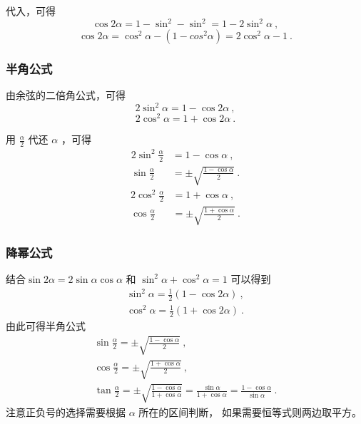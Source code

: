 代入，可得
\begin{equation}
\cos2\alpha = 1 - \sin^2 - \sin^2 = 1 - 2\sin^2\alpha~,
\end{equation}
\begin{equation}
\cos2\alpha = \cos^2\alpha - (1 - cos^2\alpha) = 2\cos^2\alpha - 1~.
\end{equation}

\subsubsection{半角公式}
由余弦的二倍角公式，可得
\begin{equation}
2\sin^2\alpha = 1 - \cos2\alpha~,
\end{equation}
\begin{equation}
2\cos^2\alpha = 1 + \cos2\alpha~.
\end{equation}

用 $\frac{\alpha}{2}$ 代还 $\alpha$ ，可得
\begin{equation}
\begin{aligned}
2\sin^2\frac{\alpha}{2} &= 1 - \cos\alpha~,\\
\sin\frac{\alpha}{2}&= \pm\sqrt{\frac{1-\cos\alpha}{2}}~.
\end{aligned}
\end{equation}
\begin{equation}
\begin{aligned}
2\cos^2\frac{\alpha}{2} &= 1 + \cos\alpha~,\\
\cos\frac{\alpha}{2} &= \pm\sqrt{\frac{1+\cos\alpha}{2}}~.
\end{aligned}
\end{equation}





\subsubsection{降幂公式}
结合$\sin 2\alpha = 2\sin \alpha\cos \alpha$ 和 $\sin^2 \alpha + \cos^2 \alpha = 1$ 可以得到
\begin{gather}
\sin^2 \alpha = \frac12 (1- \cos 2\alpha) ~, \\
\cos^2 \alpha = \frac12 (1+\cos 2\alpha)~.
\end{gather}
由此可得半角公式
\begin{gather}
\sin\frac{ \alpha}{2} = \pm\sqrt{\frac{1-\cos \alpha}{2}}~,\\
\cos\frac{ \alpha}{2}= \pm\sqrt{\frac{1+\cos \alpha}{2}}~,\\
\tan\frac{ \alpha}{2} = \pm\sqrt{\frac{1-\cos \alpha}{1+\cos \alpha}} = \frac{\sin \alpha}{1+\cos \alpha} = \frac{1-\cos \alpha}{\sin \alpha}~.
\end{gather}
注意正负号的选择需要根据 $\alpha$ 所在的区间判断， 如果需要恒等式则两边取平方。



